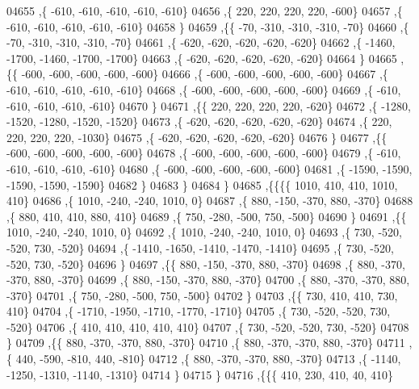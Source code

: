 \begin{DoxyCode}
04655     ,\{  -610,  -610,  -610,  -610,  -610\}
04656     ,\{   220,   220,   220,   220,  -600\}
04657     ,\{  -610,  -610,  -610,  -610,  -610\}
04658     \}
04659    ,\{\{   -70,  -310,  -310,  -310,   -70\}
04660     ,\{   -70,  -310,  -310,  -310,   -70\}
04661     ,\{  -620,  -620,  -620,  -620,  -620\}
04662     ,\{ -1460, -1700, -1460, -1700, -1700\}
04663     ,\{  -620,  -620,  -620,  -620,  -620\}
04664     \}
04665    ,\{\{  -600,  -600,  -600,  -600,  -600\}
04666     ,\{  -600,  -600,  -600,  -600,  -600\}
04667     ,\{  -610,  -610,  -610,  -610,  -610\}
04668     ,\{  -600,  -600,  -600,  -600,  -600\}
04669     ,\{  -610,  -610,  -610,  -610,  -610\}
04670     \}
04671    ,\{\{   220,   220,   220,   220,  -620\}
04672     ,\{ -1280, -1520, -1280, -1520, -1520\}
04673     ,\{  -620,  -620,  -620,  -620,  -620\}
04674     ,\{   220,   220,   220,   220, -1030\}
04675     ,\{  -620,  -620,  -620,  -620,  -620\}
04676     \}
04677    ,\{\{  -600,  -600,  -600,  -600,  -600\}
04678     ,\{  -600,  -600,  -600,  -600,  -600\}
04679     ,\{  -610,  -610,  -610,  -610,  -610\}
04680     ,\{  -600,  -600,  -600,  -600,  -600\}
04681     ,\{ -1590, -1590, -1590, -1590, -1590\}
04682     \}
04683    \}
04684   \}
04685  ,\{\{\{\{  1010,   410,   410,  1010,   410\}
04686     ,\{  1010,  -240,  -240,  1010,     0\}
04687     ,\{   880,  -150,  -370,   880,  -370\}
04688     ,\{   880,   410,   410,   880,   410\}
04689     ,\{   750,  -280,  -500,   750,  -500\}
04690     \}
04691    ,\{\{  1010,  -240,  -240,  1010,     0\}
04692     ,\{  1010,  -240,  -240,  1010,     0\}
04693     ,\{   730,  -520,  -520,   730,  -520\}
04694     ,\{ -1410, -1650, -1410, -1470, -1410\}
04695     ,\{   730,  -520,  -520,   730,  -520\}
04696     \}
04697    ,\{\{   880,  -150,  -370,   880,  -370\}
04698     ,\{   880,  -370,  -370,   880,  -370\}
04699     ,\{   880,  -150,  -370,   880,  -370\}
04700     ,\{   880,  -370,  -370,   880,  -370\}
04701     ,\{   750,  -280,  -500,   750,  -500\}
04702     \}
04703    ,\{\{   730,   410,   410,   730,   410\}
04704     ,\{ -1710, -1950, -1710, -1770, -1710\}
04705     ,\{   730,  -520,  -520,   730,  -520\}
04706     ,\{   410,   410,   410,   410,   410\}
04707     ,\{   730,  -520,  -520,   730,  -520\}
04708     \}
04709    ,\{\{   880,  -370,  -370,   880,  -370\}
04710     ,\{   880,  -370,  -370,   880,  -370\}
04711     ,\{   440,  -590,  -810,   440,  -810\}
04712     ,\{   880,  -370,  -370,   880,  -370\}
04713     ,\{ -1140, -1250, -1310, -1140, -1310\}
04714     \}
04715    \}
04716   ,\{\{\{   410,   230,   410,    40,   410\}

\end{DoxyCode}

